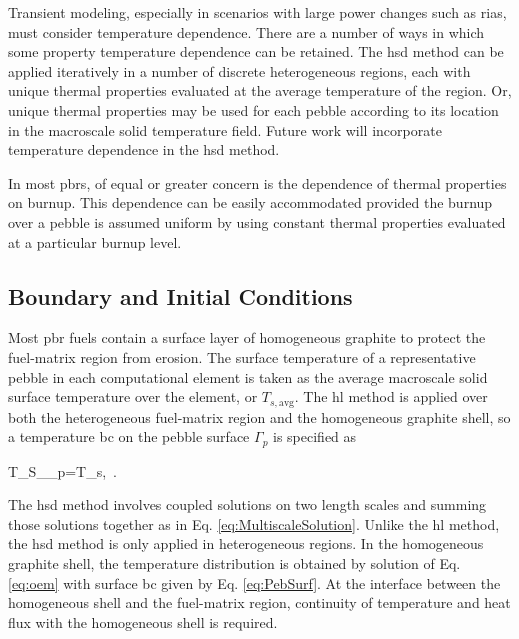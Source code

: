 Transient modeling, especially in scenarios with large power changes such as \glspl{ria}, must consider temperature dependence. There are a number of ways in which some property temperature dependence can be retained. The \gls{hsd} method can be applied iteratively in a number of discrete heterogeneous regions, each with unique thermal properties evaluated at the average temperature of the region. Or, unique thermal properties may be used for each pebble according to its location in the macroscale solid temperature field. Future work will incorporate temperature dependence in the \gls{hsd} method.

In most \glspl{pbr}, of equal or greater concern is the dependence of thermal properties on burnup. This dependence can be easily accommodated provided the burnup over a pebble is assumed uniform by using constant thermal properties evaluated at a particular burnup level.

\subsection{Boundary and Initial Conditions}
\label{sec:BCsMesoMicro}

Most \gls{pbr} fuels contain a surface layer of homogeneous graphite to protect the fuel-matrix region from erosion. The surface temperature of a representative pebble in each computational element is taken as the average macroscale solid surface temperature over the element, or \(T_{s,\text{avg}}\). The \gls{hl} method is applied over both the heterogeneous fuel-matrix region and the homogeneous graphite shell, so a temperature \gls{bc} on the pebble surface \(\Gamma_p\) is specified as

\beq
\label{eq:PebSurf}
T_S\rvert_{\Gamma_p}=T_{s,}\ .
\eeq

\noindent The \gls{hsd} method involves coupled solutions on two length scales and summing those solutions together as in Eq. \eqref{eq:MultiscaleSolution}. Unlike the \gls{hl} method, the \gls{hsd} method is only applied in heterogeneous regions. In the homogeneous graphite shell, the temperature distribution is obtained by solution of Eq. \eqref{eq:oem} with surface \gls{bc} given by Eq. \eqref{eq:PebSurf}. At the interface between the homogeneous shell and the fuel-matrix region, continuity of temperature and heat flux with the homogeneous shell is required.

